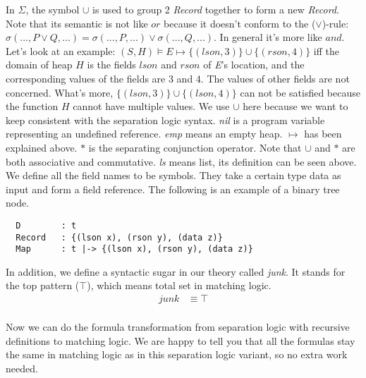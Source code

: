 \documentclass{article}
\theoremstyle{plain}
\begin{document}
In $\Sigma$, the symbol $\cup$ is used to group 2 \textit{Record} together to form a new \textit{Record}. Note that its semantic is not like $or$ because it doesn't conform to the ($\vee$)-rule: $\sigma (...,P\vee Q,...)=\sigma(...,P,...)\vee\sigma(...,Q,...)$. In general it's more like $and$. Let's look at an example: $(S,H) \models E \mapsto \{(lson,3)\}\cup\{(rson,4)\}$ iff the domain of heap $H$ is the fields $lson$ and $rson$ of \textit{E}'s location, and the corresponding values of the fields are 3 and 4. The values of other fields are not concerned. What's more, $\{(lson,3)\}\cup\{(lson,4)\}$ can not be satisfied because the function $H$ cannot have multiple values. We use $\cup$ here because we want to keep consistent with the separation logic syntax. \textit{nil} is a program variable representing an undefined reference. \textit{emp} means an empty heap. $\mapsto$ has been explained above. $*$ is the separating conjunction operator. Note that $\cup$ and $*$ are both associative and commutative. \textit{ls} means list, its definition can be seen above. We define all the field names to be symbols. They take a certain type data as input and form a field reference. The following is an example of a binary tree node.
\begin{verbatim}
  D        : t
  Record   : {(lson x), (rson y), (data z)}
  Map      : t |-> {(lson x), (rson y), (data z)}   
\end{verbatim}

In addition, we define a syntactic sugar in our theory called  \textit{junk}. It stands for the top pattern ($\top$), which means total set in matching logic. 
\begin{equation*}
\begin{split}
 junk &\equiv \top\\
\end{split}
\end{equation*}

Now we can do the formula transformation from separation logic with recursive definitions to matching logic. We are happy to tell you that all the formulas stay the same in matching logic as in this separation logic variant, so no extra work needed.
\begin{comment}
\begin{algorithm}
	\KwIn{a separation logic pattern $P$}
	\KwOut{a matching logic formula}
    \Switch{the pattern $P$}{
      \uCase{$\Pi$}
            {\Return{$\Pi$} \;}
      \uCase{$junk$}
            {\Return{$true$} \;}
      \uCase{$\Sigma$}
            {\Return{$\Sigma$} \;}
      \uCase{$\exists x . Q$}
            {\Return{$\exists x . Q$} \;}
      \uCase{$\Pi \wedge \mathtt{tobool}(\Sigma) \wedge \Delta$}
            {\Return{$\Pi \wedge \Sigma \wedge \Delta$ \;}}
    }
	\caption{The separation logic to matching logic  transformation}
\end{algorithm}
\end{comment}
\end{document}
